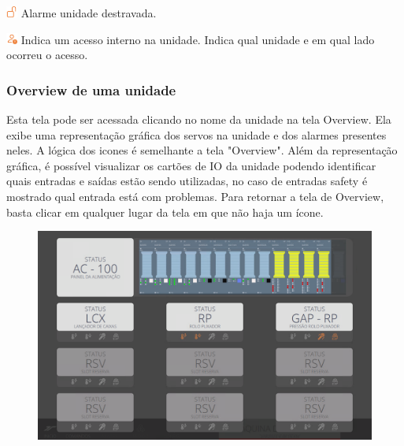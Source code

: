 \begin{alarmIcons}
\item[\ding{\dingNumber}] \includegraphics[height=1em]{src/imagesICV/13-alarmsScreen/overview/unlock-orange.png} Alarme unidade destravada.
\item[\ding{\dingNumber}] \includegraphics[height=1em]{src/imagesICV/13-alarmsScreen/overview/person-exclamation-orange.png} Indica um acesso interno na unidade. 
Indica qual unidade e em qual lado ocorreu o acesso.


\end{alarmIcons}

\newpage
\pagestyle{fancy}
\vspace*{40 pt}

\subsubsection{\small{Overview de uma unidade}}

Esta tela pode ser acessada clicando no nome da unidade na tela Overview. Ela exibe uma representação gráfica dos servos na unidade e dos alarmes presentes neles.
A lógica dos icones é semelhante a tela "Overview". Além da representação gráfica, é possível visualizar os cartões de IO da unidade podendo identificar quais entradas
e saídas estão sendo utilizadas, no caso de entradas safety é mostrado qual entrada está com problemas. Para retornar a tela de Overview, 
basta clicar em qualquer lugar da tela em que não haja um ícone.

\begin{figure}[h]
    \centering
    \includegraphics[width=384 px,height=240 px]{src/imagesICV/13-alarmsScreen/overviewUnidades.png}
  \end{figure}

